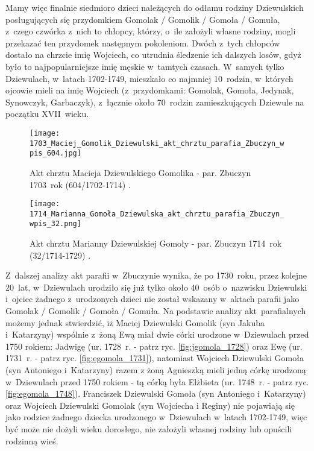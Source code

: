 Mamy więc finalnie siedmioro dzieci należących do odłamu rodziny Dziewulskich 
posługujących się przydomkiem Gomolak / Gomolik / Gomoła / Gomuła, z~czego 
czwórka z~nich to chłopcy, którzy, o~ile założyli własne rodziny, mogli 
przekazać ten przydomek następnym pokoleniom. Dwóch z~tych chłopców dostało 
na chrzcie imię Wojciech, co utrudnia śledzenie ich dalszych losów, gdyż było 
to najpopularniejsze imię męskie w~tamtych czasach. W~samych tylko 
Dziewulach, w~latach 1702-1749, mieszkało co najmniej 10~rodzin, w~których 
ojcowie mieli na imię Wojciech (z~przydomkami: Gomolak, Gomoła, Jedynak, 
Synowczyk, Garbaczyk), z~łącznie około 70~rodzin zamieszkujących Dziewule na 
początku XVII~wieku.

\begin{figure}[!ht]
    \vspace*{0.5cm}
    \centering \texttt{[image: 
        1703\_Maciej\_Gomolik\_Dziewulski\_akt\_chrztu\_parafia\_Zbuczyn\_wpis\_604.jpg]}
    \captionsetup{format=hang}
    \caption{Akt chrztu Macieja Dziewulskiego Gomolika - par. Zbuczyn 
    1703~rok (604/1702-1714) \cite{par_zbuczyn1}.}
    \label{fig:mgomola_1703}
\end{figure}

\begin{figure}[!ht]
    \vspace*{0.5cm}
    \centering \texttt{[image: 
        1714\_Marianna\_Gomoła\_Dziewulska\_akt\_chrztu\_parafia\_Zbuczyn\_wpis\_32.png]}
    \captionsetup{format=hang}
    \caption{Akt chrztu Marianny Dziewulskiej Gomoły - par. Zbuczyn 1714~rok 
    (32/1714-1729) \cite{par_zbuczyn1}.}
    \label{fig:mgomola_1714}
\end{figure}

Z~dalszej analizy akt parafii w~Zbuczynie wynika, że po 1730~roku, przez 
kolejne 20~lat, w~Dziewulach urodziło się już tylko około 40~osób o~nazwisku 
Dziewulski i~ojciec żadnego z~urodzonych dzieci nie został wskazany w~aktach 
parafii jako Gomolak / Gomolik / Gomoła / Gomuła. Na podstawie analizy 
akt~parafialnych możemy jednak stwierdzić, iż Maciej Dziewulski Gomolik 
(syn Jakuba i~Katarzyny) wspólnie z~żoną Ewą miał dwie córki urodzone 
w~Dziewulach przed 1750 rokiem: Jadwigę (ur. 1728~r. - patrz ryc. 
\ref{fig:jgomola_1728}) oraz Ewę (ur. 1731~r. - patrz ryc. 
\ref{fig:egomola_1731}), natomiast Wojciech Dziewulski Gomoła (syn Antoniego 
i~Katarzyny) razem z żoną Agnieszką mieli jedną córkę urodzoną w~Dziewulach 
przed 1750 rokiem - tą córką była Elżbieta (ur. 1748~r. - patrz ryc. 
\ref{fig:egomola_1748}). Franciszek Dziewulski Gomoła (syn Antoniego 
i~Katarzyny) oraz Wojciech Dziewulski Gomolak (syn Wojciecha i Reginy) nie 
pojawiają się jako rodzice żadnego dziecka urodzonego w~Dziewulach w~latach 
1702-1749, więc być może nie dożyli wieku dorosłego, nie założyli własnej 
rodziny lub opuścili rodzinną wieś.

